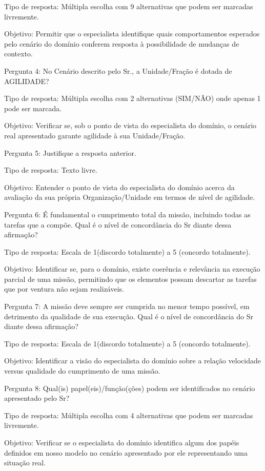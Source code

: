 Tipo de resposta: Múltipla escolha com 9 alternativas que podem ser marcadas livremente.  

Objetivo: Permitir que o especialista identifique quais comportamentos esperados pelo cenário do domínio conferem resposta à possibilidade de mudanças de contexto.


Pergunta 4: No Cenário descrito pelo Sr., a Unidade/Fração é dotada de AGILIDADE?

Tipo de resposta: Múltipla escolha com 2 alternativas (SIM/NÃO) onde apenas 1 pode ser marcada.

Objetivo: Verificar se, sob o ponto de vista do especialista do domínio, o cenário real apresentado garante agilidade à sua Unidade/Fração.


Pergunta 5: Justifique a resposta anterior.

Tipo de resposta: Texto livre.

Objetivo: Entender o ponto de vista do especialista do domínio acerca da avaliação da sua própria Organização/Unidade em termos de nível de agilidade.


Pergunta 6: É fundamental o cumprimento total da missão, incluindo todas as tarefas que a compõe. Qual é o nível de concordância do Sr diante dessa afirmação? 

Tipo de resposta: Escala de 1(discordo totalmente) a 5 (concordo totalmente).

Objetivo: Identificar se, para o domínio, existe coerência e relevância na execução parcial de uma missão, permitindo que os elementos possam descartar as tarefas que por ventura não sejam realizáveis.


Pergunta 7: A missão deve sempre ser cumprida no menor tempo possível, em detrimento da qualidade de sua execução. Qual é o nível de concordância do Sr diante dessa afirmação?

Tipo de resposta: Escala de 1(discordo totalmente) a 5 (concordo totalmente).

Objetivo: Identificar a visão do especialista do domínio sobre a relação velocidade versus qualidade do cumprimento de uma missão.


Pergunta 8: Qual(is) papel(eis)/função(ções) podem ser identificados no cenário apresentado pelo Sr?

Tipo de resposta: Múltipla escolha com 4 alternativas que podem ser marcadas livremente.  

Objetivo: Verificar se o especialista do domínio identifica algum dos papéis definidos em nosso modelo no cenário apresentado por ele representando uma situação real.